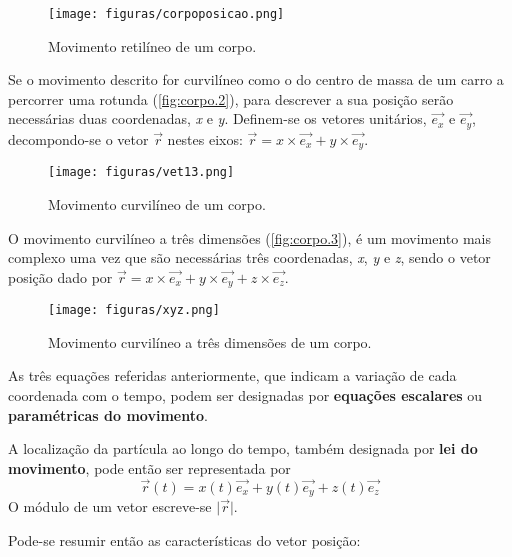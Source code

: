 \documentclass[a4paper,11pt,oneside]{report}
\begin{document}
\begin{figure}[h]
    \center
    \texttt{[image: figuras/corpoposicao.png]}
    \caption{Movimento retilíneo de um corpo.}
    \label{fig:corpo.1}
\end{figure}

Se o movimento descrito for curvilíneo como o do centro de massa de um 
carro a percorrer uma rotunda (\autoref{fig:corpo.2}), para descrever a sua posição serão necessárias duas coordenadas,
\textit{x} e \textit{y}. Definem-se os vetores unitários, \(\vec{e_x}\) e \(\vec{e_y}\), 
decompondo-se o vetor \(\vec{r}\) nestes eixos: \(\vec{r} = \textit{x} \times \vec{e_x} + \textit{y} \times \vec{e_y}\).

\begin{figure}[h]
    \center
    \texttt{[image: figuras/vet13.png]}
    \caption{Movimento curvilíneo de um corpo.}
    \label{fig:corpo.2}
\end{figure}

O movimento curvilíneo a três dimensões (\autoref{fig:corpo.3}),
é um movimento mais complexo uma vez que são necessárias três coordenadas, \textit{x}, \textit{y} e \textit{z}, sendo o vetor posição
dado por \(\vec{r} = \textit{x} \times \vec{e_x} + \textit{y} \times \vec{e_y} + \textit{z} \times \vec{e_z}\).

\begin{figure}[h]
    \center
    \texttt{[image: figuras/xyz.png]}
    \caption{Movimento curvilíneo a três dimensões de um corpo.}
    \label{fig:corpo.3}
\end{figure}

As três equações referidas anteriormente, que indicam a variação de cada coordenada com o tempo,
podem ser designadas por \textbf{equações escalares} ou \textbf{paramétricas do movimento}.

A localização da partícula ao longo do tempo, também designada por \textbf{lei do movimento},
pode então ser representada por 
\[
\vec{r}(t) = x(t)\vec{e_x} + y(t)\vec{e_y} + z(t)\vec{e_z}
\]
O módulo de um vetor escreve-se \(| \vec{r}\vert \).

Pode-se resumir então as características do vetor posição:
\end{document}
